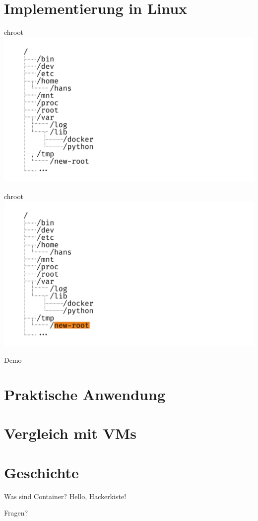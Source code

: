 \documentclass{beamer}
\begin{document}
  \section{Implementierung in Linux}
  \begin{frame}{chroot}
    \includegraphics[width=\textwidth]{fs-tree}
  \end{frame}
  \begin{frame}{chroot}
    \includegraphics[width=\textwidth]{fs-tree-highlight}
  \end{frame}
  \begin{frame}[standout]
    Demo
  \end{frame}
  
  \section{Praktische Anwendung}
  \section{Vergleich mit VMs}
  
  \section{Geschichte}
  \begin{frame}{Was sind Container?}
    Hello, Hackerkiste!
  \end{frame}


  \begin{frame}[standout]
    Fragen?
  \end{frame}
\end{document}
